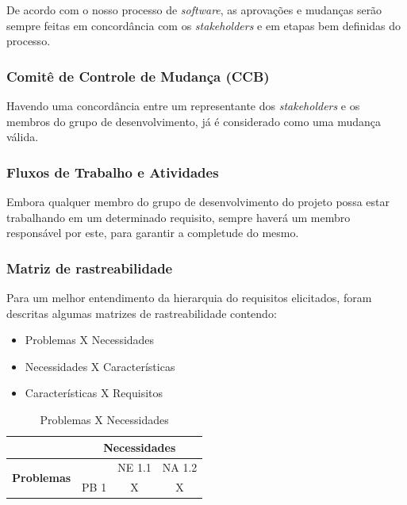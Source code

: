 De acordo com o nosso processo de \textit{software}, as aprovações e mudanças serão sempre feitas em concordância com os \textit{stakeholders} e em etapas bem definidas do processo.

\subsubsection{Comitê de Controle de Mudança (CCB)}

Havendo uma concordância entre um representante dos \textit{stakeholders} e os membros do grupo de desenvolvimento, já é considerado como uma mudança válida.

\subsubsection{Fluxos de Trabalho e Atividades}

Embora qualquer membro do grupo de desenvolvimento do projeto possa estar trabalhando em um determinado requisito, sempre haverá um membro responsável por este, para garantir a completude do mesmo.


\subsubsection{Matriz de rastreabilidade}

Para um melhor entendimento da hierarquia do requisitos elicitados, foram descritas algumas matrizes de rastreabilidade contendo:

\begin{itemize}
  \item{Problemas X Necessidades}
  \item{Necessidades X Características}
  \item{Características X Requisitos}
\end{itemize}



\begin{table}[!h]
\centering
\caption{Problemas X Necessidades}
\label{Problemas_X_Necessidades_1}
\begin{tabular}{|c|c|c|c|}
\hline
  & \multicolumn{3}{c|}{\textbf{Necessidades}} \\ \hline
    \multirow{2}{*}{\textbf{Problemas}} &             & NE 1.1        & NA 1.2       \\ \cline{2-4}
                                        & PB 1        & X             & X            \\ \hline
\end{tabular}
\end{table}

